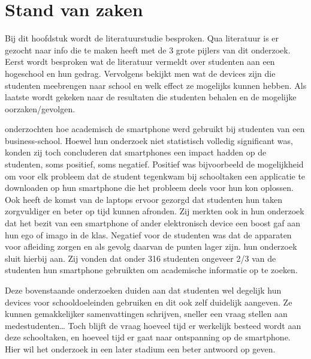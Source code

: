 \chapter{Stand van zaken}
\label{ch:stand-van-zaken}

Bij dit hoofdstuk wordt de literatuurstudie besproken. Qua literatuur is er gezocht naar info die te maken heeft met de 3 grote pijlers van dit onderzoek. Eerst wordt besproken wat de literatuur vermeldt over studenten aan een hogeschool en hun gedrag. Vervolgens bekijkt men wat de devices zijn die studenten meebrengen naar school en welk effect ze mogelijks kunnen hebben. Als laatste wordt gekeken naar de resultaten die studenten behalen en de mogelijke oorzaken/gevolgen.

\textcite{Johnson2017} onderzochten hoe academisch de smartphone werd gebruikt bij studenten van een business-school. Hoewel hun onderzoek niet statistisch volledig significant was, konden zij toch concluderen dat smartphones een impact hadden op de studenten, soms positief, soms negatief. Positief was bijvoorbeeld de mogelijkheid om voor elk probleem dat de student tegenkwam bij schooltaken een applicatie te downloaden op hun smartphone die het probleem deels voor hun kon oplossen. Ook heeft de komst van de laptops ervoor gezorgd dat studenten hun taken zorgvuldiger en beter op tijd kunnen afronden. Zij merkten ook in hun onderzoek dat het bezit van een smartphone of ander elektronisch device een boost gaf aan hun ego of imago in de klas. Negatief voor de studenten was dat de apparaten voor afleiding zorgen en als gevolg daarvan de punten lager zijn. \textcite{Hossain2016} hun onderzoek sluit hierbij aan. Zij vonden dat onder 316 studenten ongeveer 2/3 van de studenten hun smartphone gebruikten om academische informatie op te zoeken. 

Deze bovenstaande onderzoeken duiden aan dat studenten wel degelijk hun devices voor schooldoeleinden gebruiken en dit ook zelf duidelijk aangeven. Ze kunnen gemakkelijker samenvattingen schrijven, sneller een vraag stellen aan medestudenten… Toch blijft de vraag hoeveel tijd er werkelijk besteed wordt aan deze schooltaken, en hoeveel tijd er gaat naar ontspanning op de smartphone. Hier wil het onderzoek in een later stadium een beter antwoord op geven.

